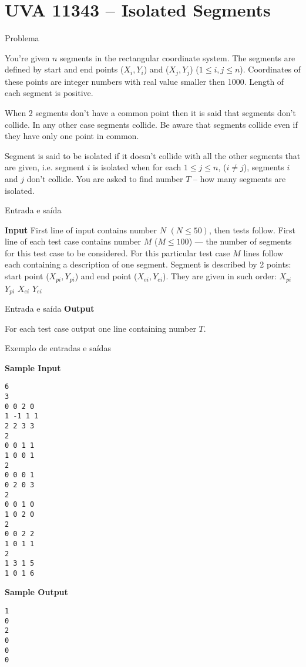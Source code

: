 \section{UVA 11343 -- Isolated Segments}

\begin{frame}[fragile]{Problema}

You’re given $n$ segments in the rectangular coordinate system. The segments are defined by start 
and end points ($X_i , Y_i$) and ($X_j , Y_j$) ($1 \leq i, j \leq n$). Coordinates of these points 
are integer numbers with real value smaller then 1000. Length of each segment is positive.

When 2 segments don’t have a common point then it is said that segments don’t collide. In any
other case segments collide. Be aware that segments collide even if they have only one point in 
common.

Segment is said to be isolated if it doesn’t collide with all the other segments that are given, 
i.e.  segment $i$ is isolated when for each $1 \leq j \leq n$, ($ i\neq j$), segments $i$ and $j$ 
don’t collide. You are asked to find number $T$ -- how many segments are isolated.

\end{frame}

\begin{frame}[fragile]{Entrada e saída}

\textbf{Input}
First line of input contains number $N$ $(N \leq 50)$, then tests follow. First line of each test 
case contains number $M$ ($M \leq 100$) — the number of segments for this test case to be 
considered. For this particular test case $M$ lines follow each containing a description of one 
segment. Segment is described by 2 points: start point ($X_{pi}, Y_{pi}$) and end point 
($X_{ei}, Y_{ei}$). They are given in such order: $X_{pi}$ $Y_{pi}$ $X_{ei}$ $Y_{ei}$
\end{frame}

\begin{frame}[fragile]{Entrada e saída}
\textbf{Output}

For each test case output one line containing number $T$.
\end{frame}

\begin{frame}[fragile]{Exemplo de entradas e saídas}

\begin{footnotesize}
\begin{minipage}[t]{0.5\textwidth}
\textbf{Sample Input}
\begin{verbatim}
6
3
0 0 2 0
1 -1 1 1
2 2 3 3
2
0 0 1 1
1 0 0 1
2
0 0 0 1
0 2 0 3
2
0 0 1 0
1 0 2 0
2
0 0 2 2
1 0 1 1
2
1 3 1 5
1 0 1 6
\end{verbatim}
\end{minipage}
\begin{minipage}[t]{0.45\textwidth}
\textbf{Sample Output}
\begin{verbatim}
1
0
2
0
0
0
\end{verbatim}
\end{minipage}
\end{footnotesize}

\end{frame}

